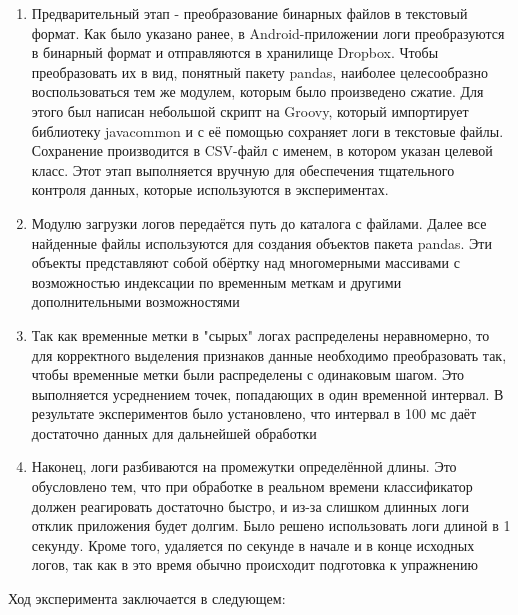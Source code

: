\begin{enumerate}
\setcounter{enumi}{0}
\item Предварительный этап - преобразование бинарных файлов в текстовый формат. Как было указано ранее, в Android-приложении логи преобразуются в бинарный формат и отправляются в хранилище Dropbox. Чтобы преобразовать их в вид, понятный пакету pandas, наиболее целесообразно воспользоваться тем же модулем, которым было произведено сжатие. Для этого был написан небольшой скрипт на Groovy, который импортирует библиотеку javacommon и с её помощью сохраняет логи в текстовые файлы. Сохранение производится в CSV-файл с именем, в котором указан целевой класс. Этот этап выполняется вручную для обеспечения тщательного контроля данных, которые используются в экспериментах.
\item Модулю загрузки логов передаётся путь до каталога с файлами. Далее все найденные файлы используются для создания объектов  пакета pandas. Эти объекты представляют собой обёртку над многомерными массивами с возможностью индексации по временным меткам и другими дополнительными возможностями
\item Так как временные метки в "сырых" логах распределены неравномерно, то для корректного выделения признаков данные необходимо преобразовать так, чтобы временные метки были распределены с одинаковым шагом. Это выполняется усреднением точек, попадающих в один временной интервал. В результате экспериментов было установлено, что интервал в 100 мс даёт достаточно данных для дальнейшей обработки
\item Наконец, логи разбиваются на промежутки определённой длины. Это обусловлено тем, что при обработке в реальном времени классификатор должен реагировать достаточно быстро, и из-за слишком длинных логи отклик приложения будет долгим. Было решено использовать логи длиной в 1 секунду. Кроме того, удаляется по секунде в начале и в конце исходных логов, так как в это время обычно происходит подготовка к упражнению
\end{enumerate}

Ход эксперимента заключается в следующем:

